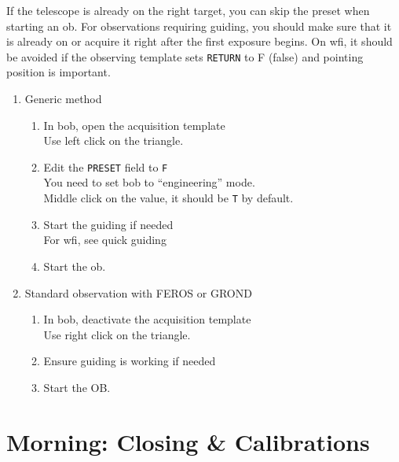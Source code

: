 \documentclass[11pt,fleqn,a4paper]{book}
\begin{document}
If the telescope is already on the right target, you can skip the \gls{preset}
when starting an \gls{ob}. For observations requiring guiding, you should make sure
that it is already on or acquire it right after the first exposure begins.  On
\gls{wfi}, it should be avoided if the observing \gls{template} sets \texttt{RETURN}
to F (false) and \gls{pointing} position is important.
\newpage
{}
\begin{enumerate}
    \item Generic method
    \begin{enumerate}
        \item In \gls{bob}, open the acquisition \gls{template}\\
          Use left click on the triangle.
        \item Edit the \texttt{PRESET} field to \texttt{F}\\
          You need to set bob to ``engineering'' mode.\\
          Middle click on the value, it should be \texttt{T} by default.
        \item Start the guiding if needed\\
              For \gls{wfi}, see quick guiding 
        \item Start the \gls{ob}.
    \end{enumerate}
    \item Standard observation with FEROS or GROND
    \begin{enumerate}
        \item In \gls{bob}, deactivate the \gls{acquisition} \gls{template}\\
              Use right click on the triangle.
        \item Ensure guiding is working if needed
        \item Start the OB.
    \end{enumerate}
\end{enumerate}
    
 
  

\chapter{Morning: Closing \& Calibrations}
\label{chap:closing}
\end{document}
